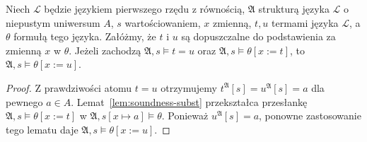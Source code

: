 \begin{lemat}
\label{lem:soundness-equality}
Niech $\mathcal L$ będzie językiem pierwszego rzędu
z równością, $\mathfrak A$ strukturą języka $\mathcal L$
o niepustym uniwersum $A$, $s$ wartościowaniem,
$x$ zmienną, $t,u$ termami języka $\mathcal L$,
a $\theta$ formułą tego języka.
Załóżmy, że $t$ i $u$ są dopuszczalne do podstawienia
za zmienną $x$ w $\theta$.
Jeżeli zachodzą $\mathfrak A,s\models t=u$ oraz
$\mathfrak A,s\models\theta[x:=t]$, to
$\mathfrak A,s\models\theta[x:=u]$.
\end{lemat}
\begin{proof}
Z prawdziwości atomu $t=u$ otrzymujemy
$t^{\mathfrak A}[s]=u^{\mathfrak A}[s]=a$
dla pewnego $a\in A$.
Lemat~\ref{lem:soundness-subst} przekształca przesłankę
$\mathfrak A,s\models\theta[x:=t]$ w
$\mathfrak A,s[x\mapsto a]\models\theta$.
Ponieważ $u^{\mathfrak A}[s]=a$, ponowne zastosowanie
tego lematu daje
$\mathfrak A,s\models\theta[x:=u]$.
\end{proof}

